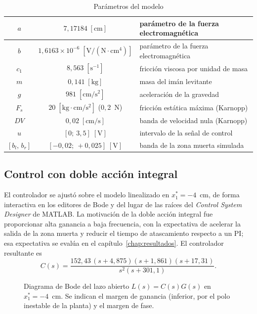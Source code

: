 \begin{table}[ht]
\centering
\caption{Parámetros del modelo}
\label{tab:parametros}
\begin{tabular}{|c|c|l|}
\hline
$a$ & $7{,}17184\;[\text{cm}]$ & parámetro de la fuerza electromagnética \\ \hline
$b$ & $1{,}6163 \times 10^{-6}\;[\text{V}/(\text{N}\cdot\text{cm}^4)]$ & parámetro de la fuerza electromagnética \\ \hline
$c_1$ & $8{,}563\;[\text{s}^{-1}]$ & fricción viscosa por unidad de masa \\ \hline
$m$ & $0{,}141\;[\text{kg}]$ & masa del imán levitante \\ \hline
$g$ & $981\;[\text{cm}/\text{s}^2]$ & aceleración de la gravedad \\ \hline
$F_s$ & $20\;[\text{kg}\cdot\text{cm}/\text{s}^2]$ ($0{,}2$~N) & fricción estática máxima (Karnopp) \\ \hline
$DV$ & $0{,}02\;[\text{cm}/\text{s}]$ & banda de velocidad nula (Karnopp) \\ \hline
$u$ & $[0;\ 3{,}5]\;[\text{V}]$ & intervalo de la señal de control \\ \hline
$[b_l,\,b_r]$ & $[-0{,}02;\ +0{,}025]\;[\text{V}]$ & banda de la zona muerta simulada \\ \hline
\end{tabular}
\end{table}




\subsection{Control con doble acción integral}
\label{sec:pii}
El controlador se ajustó sobre el modelo linealizado en $x_1^*=-4$~cm, de forma interactiva en los editores de Bode y del lugar de las raíces del \emph{Control System Designer} de MATLAB. La motivación de la doble acción integral fue proporcionar alta ganancia a baja frecuencia, con la expectativa de acelerar la salida de la zona muerta y reducir el tiempo de atascamiento respecto a un PI; esa expectativa se evalúa en el capítulo~\ref{chap:resultados}. El controlador resultante es
\begin{equation}
C(s)=\frac{152{,}43\,(s+4{,}875)(s+1{,}861)(s+17{,}31)}
{s^{2}(s+301{,}1)} .
\label{eq:pii}
\end{equation}

\begin{figure}[ht]
    \centering
    
    \caption[Diagrama de Bode]{Diagrama de Bode del lazo abierto $L(s)=C(s)G(s)$ en $x_1^*=-4$~cm. Se indican el margen de ganancia (inferior, por el polo inestable de la planta) y el margen de fase.}
    \label{bode_fase}
\end{figure}


